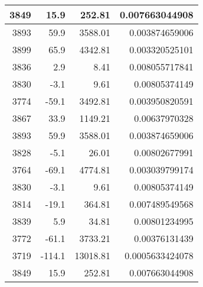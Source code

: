 \begin{longtable}{|r|r|r|r|}
3849                         & 15.9                            & 252.81                      & 0.007663044908            \\ \hline
3893                         & 59.9                            & 3588.01                     & 0.003874659006            \\ \hline
3899                         & 65.9                            & 4342.81                     & 0.003320525101            \\ \hline
3836                         & 2.9                             & 8.41                        & 0.008055717841            \\ \hline
3830                         & -3.1                            & 9.61                        & 0.00805374149             \\ \hline
3774                         & -59.1                           & 3492.81                     & 0.003950820591            \\ \hline
3867                         & 33.9                            & 1149.21                     & 0.00637970328             \\ \hline
3893                         & 59.9                            & 3588.01                     & 0.003874659006            \\ \hline
3828                         & -5.1                            & 26.01                       & 0.00802677991             \\ \hline
3764                         & -69.1                           & 4774.81                     & 0.003039799174            \\ \hline
3830                         & -3.1                            & 9.61                        & 0.00805374149             \\ \hline
3814                         & -19.1                           & 364.81                      & 0.007489549568            \\ \hline
3839                         & 5.9                             & 34.81                       & 0.00801234995             \\ \hline
3772                         & -61.1                           & 3733.21                     & 0.00376131439             \\ \hline
3719                         & -114.1                          & 13018.81                    & 0.0005633424078           \\ \hline
3849                         & 15.9                            & 252.81                      & 0.007663044908            \\ \hline

\end{longtable}
